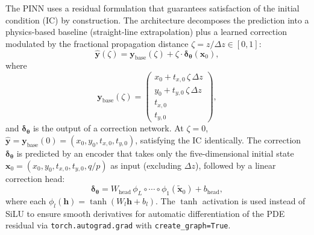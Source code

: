 \documentclass[a4paper,11pt]{article}
\newcommand{\dz}{\Delta z}
\newcommand{\btheta}{\bm{\theta}}
\begin{document}
The PINN uses a residual formulation that guarantees satisfaction of the
initial condition (IC) by construction.  The architecture decomposes the
prediction into a physics-based baseline (straight-line extrapolation)
plus a learned correction modulated by the fractional propagation
distance $\zeta = z/\dz \in [0, 1]$:
\begin{equation}
  \hat{\mathbf{y}}(\zeta) = \mathbf{y}_\text{base}(\zeta)
    + \zeta \cdot \bm{\delta}_{\btheta}(\mathbf{x}_0),
  \label{eq:pinn_residual}
\end{equation}
where
\begin{equation}
  \mathbf{y}_\text{base}(\zeta) =
  \begin{pmatrix}
    x_0 + t_{x,0}\,\zeta\,\dz \\
    y_0 + t_{y,0}\,\zeta\,\dz \\
    t_{x,0} \\
    t_{y,0}
  \end{pmatrix},
  \label{eq:baseline}
\end{equation}
and $\bm{\delta}_{\btheta}$ is the output of a correction network.
At $\zeta = 0$, $\hat{\mathbf{y}} = \mathbf{y}_\text{base}(0) =
(x_0, y_0, t_{x,0}, t_{y,0})$, satisfying the IC identically.  The
correction $\bm{\delta}_{\btheta}$ is predicted by an encoder that takes
only the five-dimensional initial state
$\mathbf{x}_0 = (x_0, y_0, t_{x,0}, t_{y,0}, q/p)$ as input (excluding
$\dz$), followed by a linear correction head:
\begin{equation}
  \bm{\delta}_{\btheta} = W_\text{head}\,
    \phi_L \circ \cdots \circ \phi_1(\tilde{\mathbf{x}}_0) + b_\text{head},
  \label{eq:correction}
\end{equation}
where each $\phi_l(\mathbf{h}) = \tanh(W_l \mathbf{h} + b_l)$.  The
$\tanh$ activation is used instead of SiLU to ensure smooth derivatives
for automatic differentiation of the PDE residual via
\texttt{torch.autograd.grad} with \texttt{create\_graph=True}.
\end{document}
